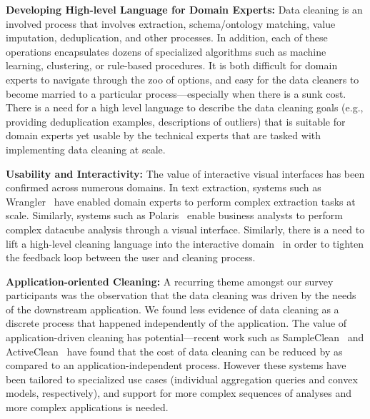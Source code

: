\noindent\textbf{Developing High-level Language for Domain Experts:} Data cleaning is an involved process that involves extraction, schema/ontology matching, value imputation, deduplication, and other processes.  In addition, each of these operations encapsulates dozens of specialized algorithms such as machine learning, clustering, or rule-based procedures.  It is both difficult for domain experts to navigate through the zoo of options, and easy for the data cleaners to become married to a particular process---especially when there is a sunk cost.  There is a need for a high level language to describe the data cleaning goals (e.g., providing deduplication examples, descriptions of outliers) that is suitable for domain experts yet usable by the technical experts that are tasked with implementing data cleaning at scale. {\color{red}{more details?}}


\noindent\textbf{Usability and Interactivity:} The value of interactive visual interfaces has been confirmed across numerous domains.  In text extraction, systems such as Wrangler~\cite{} have enabled domain experts to perform complex extraction tasks at scale.  Similarly, systems such as Polaris~\cite{tableau} enable business analysts to perform complex datacube analysis through a visual interface.  Similarly, there is a need to lift a high-level cleaning language into the interactive domain~\cite{joecidr} in order to tighten the feedback loop between the user and cleaning process.

% 

\noindent\textbf{Application-oriented Cleaning:}  A recurring theme amongst our survey participants was the observation that the data cleaning was driven by the needs of the downstream application.  We found less evidence of data cleaning as a discrete process that happened independently of the application.  The value of application-driven cleaning has potential---recent work such as SampleClean~\cite{} and ActiveClean~\cite{} have found that the cost of data cleaning can be reduced by {\color{red}{an order of magnitude or more}} as compared to an application-independent process.   However these systems have been tailored to specialized use cases (individual aggregation queries and convex models, respectively), and support for more complex sequences of analyses and more complex applications is needed.

